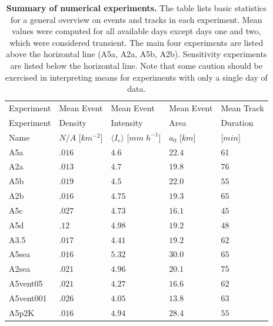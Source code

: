 \documentclass[draft,linenumbers]{agujournal2019}
\begin{document}
\begin{table}[b]
\centering
\begin{tabular}{lllll}
    Experiment & Mean Event & Mean Event & Mean Event & Mean Track\\
    Experiment & Density & Intensity & Area & Duration\\
    Name & $N/A$ [$km^{-2}$] & $\langle I_e\rangle$ [$mm\;h^{-1}$] & $a_0$ [$km$] & [$min$]\\
    \hline
    A5a & $.016$ & $4.6$ & $22.4$ & 61 \\
    A2a & $.013$ & $4.7$ & $19.8$ & 76\\
    A5b & $.019$ & $4.5$ & $22.0$ & $55$\\
    A2b & $.016$ & $4.75$ & $19.3$ & $65$\\
    \hline
    A5c & $.027$ & $4.73$ & $16.1$ & $45$\\
    A5d & $.12$ & $4.98$ & $19.2$ & $48$\\
    A3.5 & $.017$ & $4.41$ & $19.2$ & $62$\\
    A5sea & $.016$ & $5.32$ & $30.0$ & $65$\\
    A2sea & $.021$ & $4.96$ & $20.1$ & $75$\\
    A5vent05 & $.021$ & $4.27$ & $16.6$ & $62$\\
    A5vent001 & $.026$ & $4.05$ & $13.8$ & $63$\\
    A5p2K & $.016$ & $4.94$ & $28.4$ & $55$\\
    \hline
\end{tabular}
\caption{{\bf Summary of numerical experiments.}
The table lists basic statistics for a general overview on events and tracks in each experiment. 
Mean values were computed for all available days except days one and two, which were considered transient. 
The main four experiments are listed above the horizontal line (A5a, A2a, A5b, A2b). 
Sensitivity experiments are listed below the horizontal line. 
Note that some caution should be exercised in interpreting means for experiments with only a single day of data.
}
\label{tab:basic_stats}
\end{table}
\end{document}
